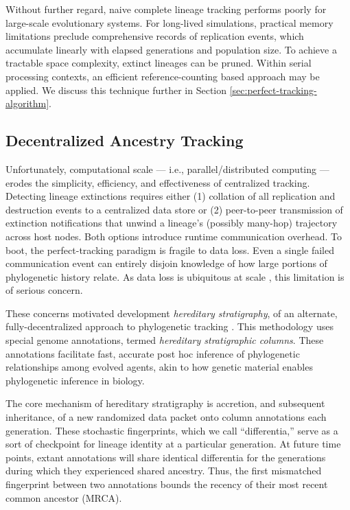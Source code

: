Without further regard, naive complete lineage tracking performs poorly for large-scale evolutionary systems.
For long-lived simulations, practical memory limitations preclude comprehensive records of replication events, which accumulate linearly with elapsed generations and population size.
To achieve a tractable space complexity, extinct lineages can be pruned.
Within serial processing contexts, an efficient reference-counting based approach may be applied.
We discuss this technique further in Section \ref{sec:perfect-tracking-algorithm}.

\subsection{Decentralized Ancestry Tracking}

Unfortunately, computational scale --- i.e., parallel/distributed computing --- erodes the simplicity, efficiency, and effectiveness of centralized tracking.
Detecting lineage extinctions requires either (1) collation of all replication and destruction events to a centralized data store or (2) peer-to-peer transmission of extinction notifications that unwind a lineage's (possibly many-hop) trajectory across host nodes.
Both options introduce runtime communication overhead.
To boot, the perfect-tracking paradigm is fragile to data loss.
Even a single failed communication event can entirely disjoin knowledge of how large portions of phylogenetic history relate.
As data loss is ubiquitous at scale \citep{cappello2014toward,ackley2011pursue}, this limitation is of serious concern.

These concerns motivated development \textit{hereditary stratigraphy}, of an alternate, fully-decentralized approach to phylogenetic tracking \citep{moreno2022hereditary}.
This methodology uses special genome annotations, termed \textit{hereditary stratigraphic columns}.
These annotations facilitate fast, accurate post hoc inference of phylogenetic relationships among evolved agents, akin to how genetic material enables phylogenetic inference in biology.

The core mechanism of hereditary stratigraphy is accretion, and subsequent inheritance, of a new randomized data packet onto column annotations each generation.
These stochastic fingerprints, which we call ``differentia,'' serve as a sort of checkpoint for lineage identity at a particular generation.
At future time points, extant annotations will share identical differentia for the generations during which they experienced shared ancestry.
Thus, the first mismatched fingerprint between two annotations bounds the recency of their most recent common ancestor (MRCA).

